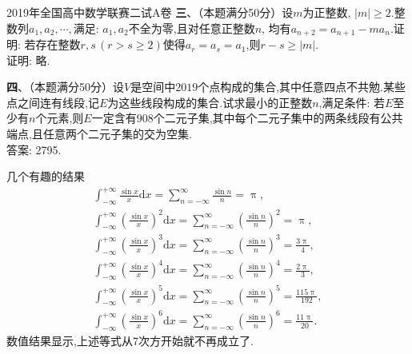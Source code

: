 \documentclass[UTF8,no-math,12pt,openany,table,dvipsnames,svgnames]{book}
\renewcommand{\pi}{\uppi}
\renewcommand{\ge}{\geqslant}
\begin{document}
\begin{MYBOX}[colbacktitle=blue]{2019年全国高中数学联赛二试A卷}
\textbf{三}、（{\kaishu 本题满分50分}）设$m$为正整数, $|m|\ge2$.整数列$a_1,a_2,\cdots,$满足: $a_1,a_2$不全为零,且对任意正整数$n$, 均有$a_{n+2}=a_{n+1}-ma_n$.证明: 若存在整数$r,s\,(r>s\ge2)$使得$a_r=a_s=a_1$,则$r-s\ge|m|$.\\
证明: 略.

\textbf{四}、（{\kaishu 本题满分50分}）设$V$是空间中$2019$个点构成的集合,其中任意四点不共勉.某些点之间连有线段,记$E$为这些线段构成的集合.试求最小的正整数$n$,满足条件: 若$E$至少有$n$个元素,则$E$一定含有$908$个二元子集,其中每个二元子集中的两条线段有公共端点,且任意两个二元子集的交为空集.\\
答案: 2795.
\end{MYBOX}
\begin{MYBOX}[colbacktitle=cyan]{几个有趣的结果}
\begin{gather*}
\int_{-\infty}^{+\infty}{\frac{\sin x}{x}\text{d}x}=\sum_{n=-\infty}^{\infty}{\frac{\sin n}{n}}=\pi,\\
\int_{-\infty}^{+\infty}{\left( \frac{\sin x}{x} \right) ^2\text{d}x}=\sum_{n=-\infty}^{\infty}{\left( \frac{\sin n}{n} \right) ^2}=\pi,\\
\int_{-\infty}^{+\infty}{\left( \frac{\sin x}{x} \right) ^3\text{d}x}=\sum_{n=-\infty}^{\infty}{\left( \frac{\sin n}{n} \right) ^3}=\frac{3\pi}{4},\\
\int_{-\infty}^{+\infty}{\left( \frac{\sin x}{x} \right) ^4\text{d}x}=\sum_{n=-\infty}^{\infty}{\left( \frac{\sin n}{n} \right) ^4}=\frac{2\pi}{3},\\
\int_{-\infty}^{+\infty}{\left( \frac{\sin x}{x} \right) ^5\text{d}x}=\sum_{n=-\infty}^{\infty}{\left( \frac{\sin n}{n} \right) ^5}=\frac{115\pi}{192},\\
\int_{-\infty}^{+\infty}{\left( \frac{\sin x}{x} \right) ^6\text{d}x}=\sum_{n=-\infty}^{\infty}{\left( \frac{\sin n}{n} \right) ^6}=\frac{11\pi}{20}.
\end{gather*}
数值结果显示,上述等式从7次方开始就不再成立了.
\end{MYBOX}
\end{document}
